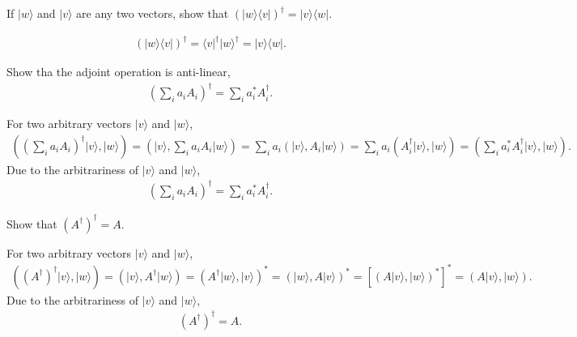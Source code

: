 \documentclass[en]{sol-man}
\begin{document}
\begin{exe}
    If $\lvert w\rangle$ and $\lvert v\rangle$ are any two vectors, show that $(\lvert w\rangle\langle v\rvert)^{\dagger}=\lvert v\rangle\langle w\rvert$.
\end{exe}
\begin{pf}
    \begin{align}
        (\lvert w\rangle\langle v\rvert)^{\dagger}=\langle v\rvert^{\dagger}\lvert w\rangle^{\dagger}=\lvert v\rangle\langle w\rvert.
    \end{align}
\end{pf}

\begin{exe}
    Show tha the adjoint operation is anti-linear,
    \begin{align}
        \left(\sum_ia_iA_i\right)^{\dagger}=\sum_ia_i^*A_i^{\dagger}.
    \end{align}
\end{exe}
\begin{pf}
    For two arbitrary vectors $\lvert v\rangle$ and $\lvert w\rangle$,
    \begin{align}
        \left(\left(\sum_ia_iA_i\right)^{\dagger}\lvert v\rangle,\lvert w\rangle\right)=\left(\lvert v\rangle,\sum_ia_iA_i\lvert w\rangle\right)=\sum_ia_i(\lvert v\rangle,A_i\lvert w\rangle)=\sum_ia_i(A_i^{\dagger}\lvert v\rangle,\lvert w\rangle)=\left(\sum_ia_i^*A_i^{\dagger}\lvert v\rangle,\lvert w\rangle\right).
    \end{align}
    Due to the arbitrariness of $\lvert v\rangle$ and $\lvert w\rangle$,
    \begin{align}
        \left(\sum_ia_iA_i\right)^{\dagger}=\sum_ia_i^*A_i^{\dagger}.
    \end{align}
\end{pf}

\begin{exe}
    Show that $(A^{\dagger})^{\dagger}=A$.
\end{exe}
\begin{pf}
    For two arbitrary vectors $\lvert v\rangle$ and $\lvert w\rangle$,
    \begin{align}
        ((A^{\dagger})^{\dagger}\lvert v\rangle,\lvert w\rangle)=(\lvert v\rangle,A^{\dagger}\lvert w\rangle)=(A^{\dagger}\lvert w\rangle,\lvert v\rangle)^*=(\lvert w\rangle,A\lvert v\rangle)^*=[(A\lvert v\rangle,\lvert w\rangle)^*]^*=(A\lvert v\rangle,\lvert w\rangle).
    \end{align}
    Due to the arbitrariness of $\lvert v\rangle$ and $\lvert w\rangle$,
    \begin{align}
        (A^{\dagger})^{\dagger}=A.
    \end{align}
\end{pf}
\end{document}
